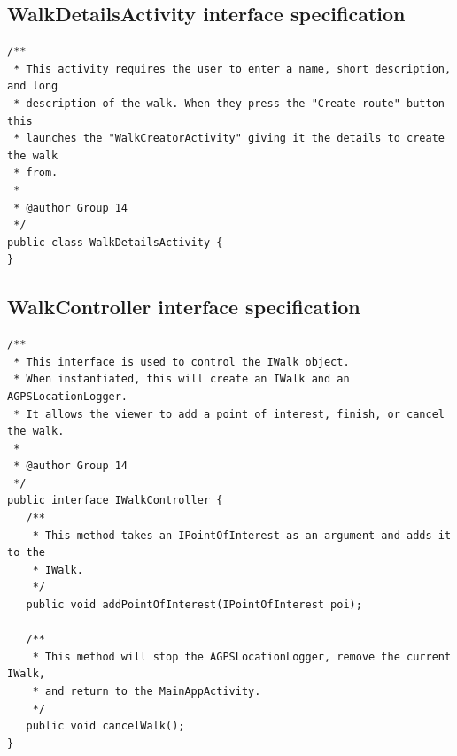 \documentclass{project}
\begin{document}
\subsection{WalkDetailsActivity interface specification}
\begin{verbatim}/**
 * This activity requires the user to enter a name, short description, and long
 * description of the walk. When they press the "Create route" button this
 * launches the "WalkCreatorActivity" giving it the details to create the walk
 * from.
 *
 * @author Group 14
 */
public class WalkDetailsActivity {
}\end{verbatim}

\newpage

\subsection{WalkController interface specification}
\begin{verbatim}/**
 * This interface is used to control the IWalk object. 
 * When instantiated, this will create an IWalk and an AGPSLocationLogger.
 * It allows the viewer to add a point of interest, finish, or cancel the walk.
 *
 * @author Group 14
 */
public interface IWalkController {
   /**
    * This method takes an IPointOfInterest as an argument and adds it to the
    * IWalk.
    */
   public void addPointOfInterest(IPointOfInterest poi);
    
   /**
    * This method will stop the AGPSLocationLogger, remove the current IWalk,
    * and return to the MainAppActivity.
    */
   public void cancelWalk();
}\end{verbatim}

\newpage
\end{document}
